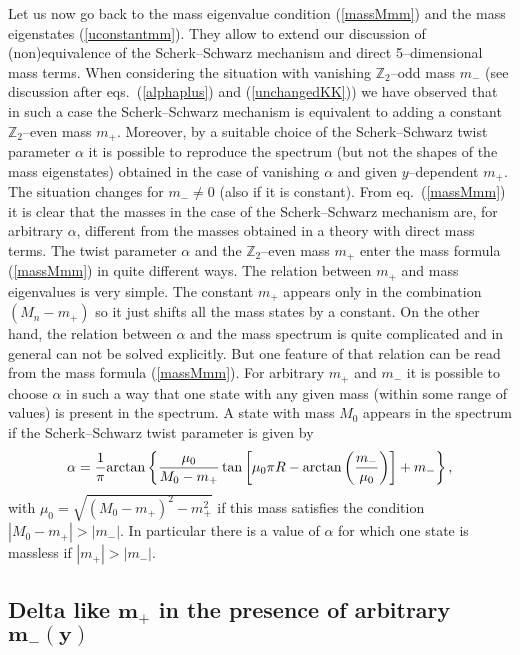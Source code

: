 \documentclass[a4paper,12pt]{article}
\def\arctan{{\rm arctan}}
\def\al{\alpha}
\def\ZZ{\mathbb Z}
\begin{document}
Let us now go back to the mass eigenvalue condition (\ref{massMmm})
and the mass eigenstates (\ref{uconstantmm}). They allow to extend
our discussion of (non)equivalence of the Scherk--Schwarz mechanism
and direct 5--dimensional mass terms. 
When considering the situation with vanishing $\ZZ_2$--odd mass $m_-$
(see discussion after eqs.\ (\ref{alphaplus}) and (\ref{unchangedKK}))
we have observed that in such a case the Scherk--Schwarz mechanism is
equivalent to adding a constant $\ZZ_2$--even mass $m_+$. Moreover, by
a suitable choice of the Scherk--Schwarz 
twist parameter $\al$ it is possible to reproduce the spectrum (but
not the shapes of the mass eigenstates) obtained in the case of
vanishing $\al$ and given $y$--dependent $m_+$.
The situation changes for $m_-\ne0$ (also if it is constant). From
eq.\ (\ref{massMmm}) it is clear that the masses in the case of the
Scherk--Schwarz mechanism are, for arbitrary $\al$, different from
the masses obtained in a theory with direct mass terms. 
The twist parameter
$\al$ and the $\ZZ_2$--even mass $m_+$ enter the mass formula
(\ref{massMmm}) in quite different ways.
The relation between $m_+$ and mass eigenvalues is very simple.
The constant $m_+$ appears only in the combination $(M_n-m_+)$ so it
just shifts all the mass states by a constant. 
On the other hand, the relation between $\al$ and the mass spectrum
is quite complicated and in general can not be solved explicitly. 
But one feature of that relation can be read from the mass formula
(\ref{massMmm}). For arbitrary $m_+$ and $m_-$ it is possible to
choose $\al$ in such a way that one state with any given mass (within
some range of values) is present
in the spectrum. A state with mass $M_0$ appears in the spectrum
if the Scherk--Schwarz twist parameter is given by
\begin{equation}
\al
=
\frac{1}{\pi}
\arctan\left\{\frac{\mu_0}{M_0-m_+}
\tan\left[\mu_0\pi R-\arctan\left(\frac{m_-}{\mu_0}\right)
\right]+m_-\right\}
,
\end{equation}
with $\mu_0=\sqrt{(M_0-m_+)^2-m_+^2}$ if this mass satisfies the
condition $|M_0-m_+|>|m_-|$. In particular there is a value of $\al$
for which one state is massless if $|m_+|>|m_-|$.




\subsection{Delta like $\boldsymbol{m_+}$ in the presence of arbitrary
$\boldsymbol{m_-(y)}$} 
\end{document}
